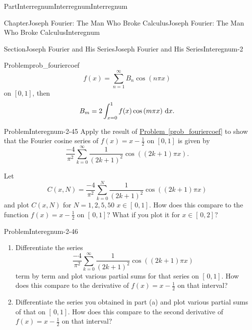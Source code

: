 \documentclass[oneside,10pt,]{book}
\newcommand{\xreffont}{\relax}
\numberwithin{equation}{part}
\newcommand{\dx}[1]{\,{\rm d}#1}
\begin{document}
\begin{partptx}{Part}{Interregnum}{}{Interregnum}{}{}{Interregnum}
\begin{chapterptx}{Chapter}{Joseph Fourier: The Man Who Broke Calculus}{}{Joseph Fourier: The Man Who Broke Calculus}{}{}{Interegnum}
\begin{sectionptx}{Section}{Joseph Fourier and His Series}{}{Joseph Fourier and His Series}{}{}{Interegnum-2}
\begin{problem}{Problem}{}{prob_fouriercoef}
\begin{equation*}
f(x)=\sum_{n=1}^\infty B_n\cos\left(n\pi x\right)
\end{equation*}
on \([0,1]\), then%
\begin{equation*}
B_m=2\int_{x=0}^1f(x)\cos\left(m\pi x\right)\dx{ x}.{}
\end{equation*}
%
\end{problem}
\begin{problem}{Problem}{}{Interegnum-2-45}%
Apply the result of \hyperref[prob_fouriercoef]{Problem~{\xreffont\ref{prob_fouriercoef}}} to show that the Fourier cosine series of \(f(x)=x-\frac{1}{2}\) on \([0,1]\) is given by%
\begin{equation*}
\frac{-4}{\pi^2}\sum_{k=0}^\infty\frac{1}{\left(2k+1\right)^2}\cos \left((2k+1)\pi x\right)\text{.}
\end{equation*}
%
\par
Let%
\begin{equation*}
C(x,N)=\frac{-4}{\pi^2}\sum_{k=0}^N\frac{1}{\left(2k+1\right)^2}\cos
\left((2k+1)\pi x\right)
\end{equation*}
and plot \(C(x,N)\) for \(N=1,2,5,50\) \(x\in[\,0,1]\). How does this compare to the function \(f(x)=x-\frac{1}{2}\) on \([\,0,1]\)? What if you plot it for \(x\in[\,0,2]?\)%
\end{problem}
\begin{problem}{Problem}{}{Interegnum-2-46}%
\begin{enumerate}[font=\bfseries,label=(\alph*),ref=\alph*]%
\item{}Differentiate the series%
\begin{equation*}
\frac{-4}{\pi^2}\sum_{k=0}^\infty\frac{1}{\left(2k+1\right)^2}\cos \left((2k+1)\pi x\right)
\end{equation*}
term by term and plot various partial sums for that series on \([\,0,1]\).  How does this compare to the derivative of \(f(x)=x-\frac{1}{2}\) on that interval?%
\item{}Differentiate the series you obtained in part (a) and plot various partial sums of that on \([\,0,1]\).  How does this compare to the second derivative of \(f(x)=x-\frac{1}{2}\) on that interval?%
\end{enumerate}%
\end{problem}
\end{sectionptx}
\end{chapterptx}
\end{partptx}
%
%
\typeout{************************************************}
\end{document}
